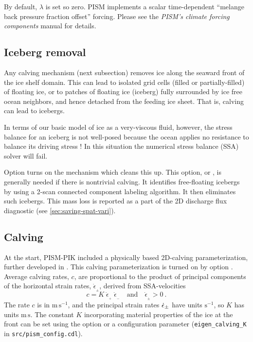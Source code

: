 By default, $\lambda$ is set so zero. PISM implements a scalar time-dependent ``melange back pressure fraction offset'' forcing. Please see the \emph{PISM's climate forcing components} manual for details.

\subsection{Iceberg removal}
\label{sec:kill-icebergs}
Any calving mechanism (next subsection) removes ice along the seaward front of the ice shelf domain.  This can lead to isolated grid cells (filled or partially-filled) of floating ice, or to patches of floating ice (iceberg) fully surrounded by ice free ocean neighbors, and hence detached from the feeding ice sheet.  That is, calving can lead to icebergs.

In terms of our basic model of ice as a very-viscous fluid, however, the stress balance for an iceberg is not well-posed because the ocean applies no resistance to balance its driving stress \cite{SchoofStream}!  In this situation the numerical stress balance (SSA) solver will fail.

Option  turns on the mechanism which cleans this up.  This option, or , is generally needed if there is nontrivial calving.  It identifies free-floating icebergs by using a 2-scan connected component labeling algorithm. It then eliminates such icebergs.  This mass loss is reported as a part of the 2D discharge flux diagnostic (see \ref{sec:saving-spat-vari}).


\subsection{Calving}
\label{sec:calving}
At the start, PISM-PIK included a physically based 2D-calving parameterization, further developed in \cite{Levermannetal2012}. This calving parameterization is turned on by option .  Average calving rates, $c$, are proportional to the product of principal components of the horizontal strain rates, $\dot{\epsilon}_{_\pm}$, derived from SSA-velocities 
\begin{equation}
\label{eq: calv2}
c = K\; \dot{\epsilon}_{_+}\; \dot{\epsilon}_{_-}\quad\text{and}\quad\dot{\epsilon}_{_\pm}>0\:.
\end{equation}
The rate $c$ is in $\text{m}\,\text{s}^{-1}$, and the principal strain rates $\dot{\epsilon}_\pm$ have units $\text{s}^{-1}$, so $K$ has units $\text{m}\,\text{s}$.  The constant $K$ incorporating material properties of the ice at the front can be set using the  option or a configuration parameter (\texttt{eigen_calving_K} in \texttt{src/pism_config.cdl}).

